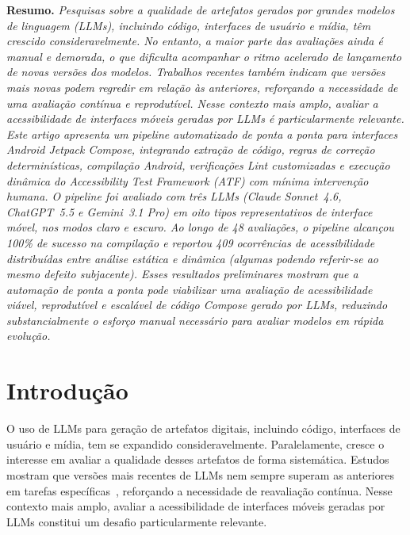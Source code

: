 \documentclass[sigconf,review]{webmedia}
\begin{document}
\noindent\textbf{Resumo.}\enspace\textit{%
Pesquisas sobre a qualidade de artefatos gerados por grandes modelos de
linguagem (LLMs), incluindo código, interfaces de usuário e mídia, têm crescido
consideravelmente. No entanto, a maior parte das avaliações ainda é manual e
demorada, o que dificulta acompanhar o ritmo acelerado de lançamento de novas
versões dos modelos. Trabalhos recentes também indicam que versões mais novas
podem regredir em relação às anteriores, reforçando a necessidade de uma
avaliação contínua e reprodutível. Nesse contexto mais amplo, avaliar a
acessibilidade de interfaces móveis geradas por LLMs é particularmente
relevante. Este artigo apresenta um pipeline automatizado de ponta a ponta para
interfaces Android Jetpack Compose, integrando extração de código, regras de
correção determinísticas, compilação Android, verificações Lint customizadas e
execução dinâmica do Accessibility Test Framework (ATF) com mínima intervenção
humana. O pipeline foi avaliado com três LLMs (Claude Sonnet~4.6, ChatGPT~5.5
e Gemini~3.1 Pro) em oito tipos representativos de interface móvel, nos
modos claro e escuro. Ao longo de 48 avaliações, o pipeline alcançou 100\%
de sucesso na compilação e reportou 409 ocorrências de acessibilidade
distribuídas entre análise estática e dinâmica (algumas podendo referir-se
ao mesmo defeito subjacente). Esses
resultados preliminares mostram que a automação de ponta a ponta pode
viabilizar uma avaliação de acessibilidade viável, reprodutível e escalável
de código Compose gerado por LLMs, reduzindo substancialmente o esforço
manual necessário para avaliar modelos em rápida evolução.}

\vspace{4pt}

\section{Introdução}
\label{sec:intro}

O uso de LLMs para geração de artefatos digitais, incluindo código,
interfaces de usuário e mídia, tem se expandido consideravelmente. Paralelamente,
cresce o interesse em avaliar a qualidade desses artefatos de forma sistemática.
Estudos mostram que versões mais recentes de LLMs nem sempre superam as
anteriores em tarefas específicas~\cite{chen2023chatgpt}, reforçando a
necessidade de reavaliação contínua. Nesse contexto mais amplo, avaliar a
acessibilidade de interfaces móveis geradas por LLMs constitui um desafio
particularmente relevante.
\end{document}
